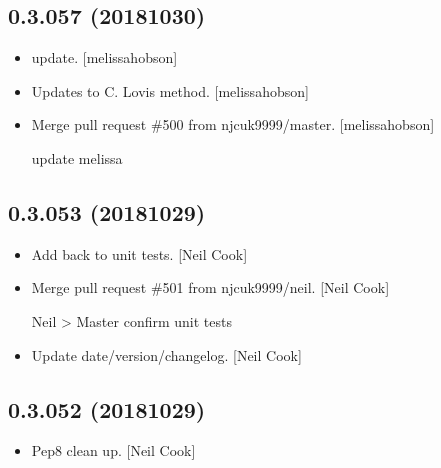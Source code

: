 \documentclass[a4paper,10pt,english]{report}
\begin{document}
\subsection{0.3.057 (2018\sphinxhyphen{}10\sphinxhyphen{}30)}
\label{\detokenize{misc/changelog:id296}}\begin{itemize}
\item {} 
 update. {[}melissa\sphinxhyphen{}hobson{]}

\item {} 
Updates to C. Lovis method. {[}melissa\sphinxhyphen{}hobson{]}

\item {} 
Merge pull request \#500 from njcuk9999/master. {[}melissa\sphinxhyphen{}hobson{]}

update melissa

\end{itemize}


\subsection{0.3.053 (2018\sphinxhyphen{}10\sphinxhyphen{}29)}
\label{\detokenize{misc/changelog:id297}}\begin{itemize}
\item {} 
Add  back to unit tests. {[}Neil Cook{]}

\item {} 
Merge pull request \#501 from njcuk9999/neil. {[}Neil Cook{]}

Neil \textendash{}\textgreater{} Master \sphinxhyphen{} confirm unit tests

\item {} 
Update date/version/changelog. {[}Neil Cook{]}

\end{itemize}


\subsection{0.3.052 (2018\sphinxhyphen{}10\sphinxhyphen{}29)}
\label{\detokenize{misc/changelog:id298}}\begin{itemize}
\item {} 
Pep8 clean up. {[}Neil Cook{]}

\end{itemize}
\end{document}
